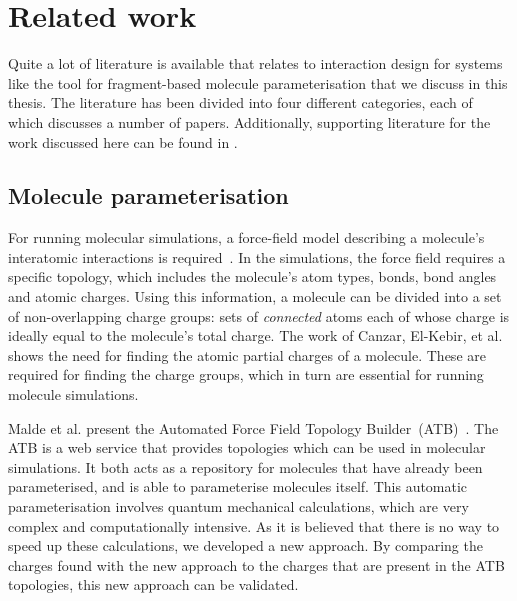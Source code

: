 \chapter{Related work}

Quite a lot of literature is available that relates to interaction design for systems like the tool for fragment-based molecule parameterisation that we discuss in this thesis. The literature has been divided into four different categories, each of which discusses a number of papers. Additionally, supporting literature for the work discussed here can be found in .


\section{Molecule parameterisation}
For running molecular simulations, a force-field model describing a molecule's interatomic interactions is required~\cite{canzar2012charge}. In the simulations, the force field requires a specific topology, which includes the molecule's atom types, bonds, bond angles and atomic charges. Using this information, a molecule can be divided into a set of non-overlapping charge groups: sets of \emph{connected} atoms each of whose charge is ideally equal to the molecule's total charge. The work of Canzar, El-Kebir, et al. shows the need for finding the atomic partial charges of a molecule. These are required for finding the charge groups, which in turn are essential for running molecule simulations.

Malde et al. present the Automated Force Field Topology Builder~(ATB)~\cite{malde2011automated}. The ATB is a web service that provides topologies which can be used in molecular simulations. It both acts as a repository for molecules that have already been parameterised, and is able to parameterise molecules itself. This automatic parameterisation involves quantum mechanical calculations, which are very complex and computationally intensive. As it is believed that there is no way to speed up these calculations, we developed a new approach. By comparing the charges found with the new approach to the charges that are present in the ATB topologies, this new approach can be validated.


